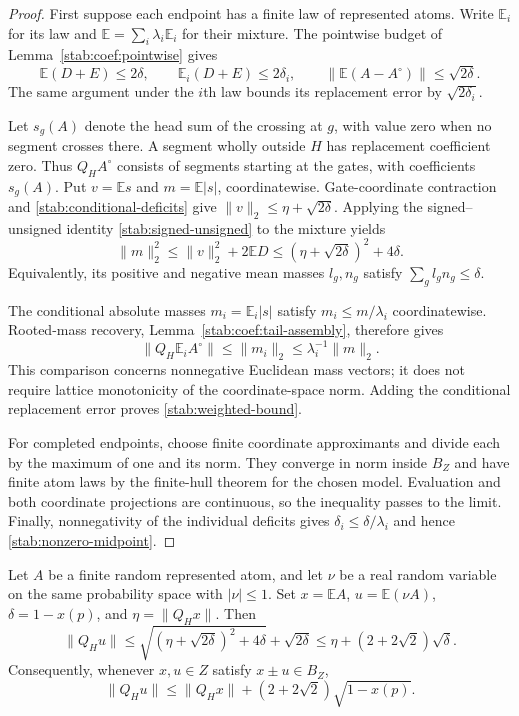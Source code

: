 \begin{proof}
First suppose each endpoint has a finite law of represented atoms.
Write $\mathbb E_i$ for its law and
$\mathbb E=\sum_i\lambda_i\mathbb E_i$ for their mixture.
The pointwise budget of Lemma~\ref{stab:coef:pointwise} gives
\begin{equation}\label{stab:conditional-deficits}
 \mathbb E(D+E)\le2\delta,\qquad
 \mathbb E_i(D+E)\le2\delta_i,
 \qquad
 \|\mathbb E(A-A^\circ)\|\le\sqrt{2\delta}.
\end{equation}
The same argument under the $i$th law bounds its replacement error
by $\sqrt{2\delta_i}$.

Let $s_g(A)$ denote the head sum of the crossing at $g$, with value
zero when no segment crosses there.  A segment wholly outside $H$
has replacement coefficient zero.  Thus $Q_HA^\circ$ consists of
segments starting at the gates, with coefficients $s_g(A)$.
Put $v=\mathbb E s$ and $m=\mathbb E|s|$, coordinatewise.
Gate-coordinate contraction and \eqref{stab:conditional-deficits}
give $\|v\|_2\le\eta+\sqrt{2\delta}$.  Applying the
signed--unsigned identity \eqref{stab:signed-unsigned} to the
mixture yields
\[
 \|m\|_2^2\le\|v\|_2^2+2\mathbb ED
 \le(\eta+\sqrt{2\delta})^2+4\delta.
\]
Equivalently, its positive and negative mean masses $l_g,n_g$
satisfy $\sum_gl_gn_g\le\delta$.

The conditional absolute masses $m_i=\mathbb E_i|s|$ satisfy
$m_i\le m/\lambda_i$ coordinatewise.  Rooted-mass recovery,
Lemma~\ref{stab:coef:tail-assembly}, therefore gives
\[
 \|Q_H\mathbb E_iA^\circ\|
 \le\|m_i\|_2\le\lambda_i^{-1}\|m\|_2.
\]
This comparison concerns nonnegative Euclidean mass vectors; it
does not require lattice monotonicity of the coordinate-space norm.
Adding the conditional replacement error proves
\eqref{stab:weighted-bound}.

For completed endpoints, choose finite coordinate approximants and
divide each by the maximum of one and its norm.  They converge in
norm inside $B_Z$ and have finite atom laws by the finite-hull
theorem for the chosen model.  Evaluation and both coordinate
projections are continuous, so the inequality passes to the limit.
Finally, nonnegativity of the individual deficits gives
$\delta_i\le\delta/\lambda_i$ and hence
\eqref{stab:nonzero-midpoint}.
\end{proof}

\begin{corollary}\label{stab:bounded-multiplier}
Let $A$ be a finite random represented atom, and let $\nu$ be a real
random variable on the same probability space with $|\nu|\le1$.
Set $x=\mathbb EA$, $u=\mathbb E(\nu A)$,
$\delta=1-x(p)$, and $\eta=\|Q_Hx\|$.  Then
\begin{equation}\label{stab:bounded-multiplier-bound}
 \|Q_Hu\|
 \le\sqrt{(\eta+\sqrt{2\delta})^2+4\delta}+\sqrt{2\delta}
 \le\eta+(2+2\sqrt2)\sqrt\delta.
\end{equation}
Consequently, whenever $x,u\in Z$ satisfy $x\pm u\in B_Z$,
\begin{equation}\label{stab:symmetric-tail}
 \|Q_Hu\|\le\|Q_Hx\|+(2+2\sqrt2)\sqrt{1-x(p)}.
\end{equation}
\end{corollary}

